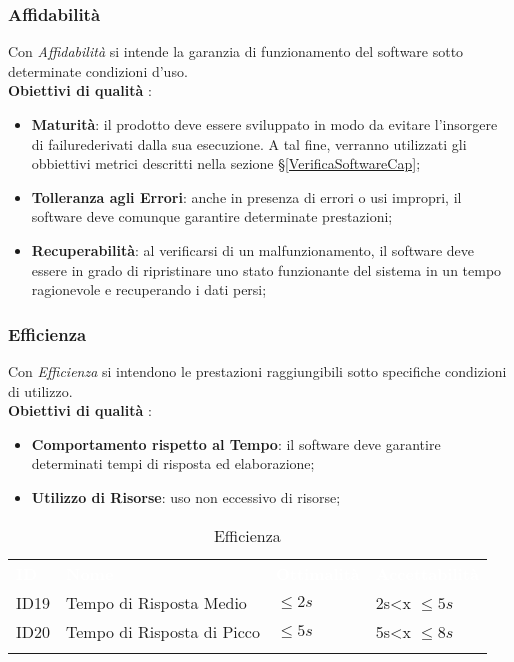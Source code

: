 \subsubsection{Affidabilità}

Con \textit{Affidabilità} si intende la garanzia di funzionamento del software sotto determinate condizioni d'uso. \\
\textbf{Obiettivi di qualità} :

\begin{itemize}
	\item \textbf{Maturità}: il prodotto deve essere sviluppato in modo da evitare l'insorgere di failure\glossario derivati dalla sua esecuzione. A tal fine, verranno utilizzati gli obbiettivi metrici descritti nella sezione §\ref{VerificaSoftwareCap};
	\item \textbf{Tolleranza agli Errori}: anche in presenza di errori o usi impropri, il software deve comunque garantire determinate prestazioni;
	\item \textbf{Recuperabilità}: al verificarsi di un malfunzionamento, il software deve essere in grado di ripristinare uno stato funzionante del sistema in un tempo ragionevole e recuperando i dati persi;
\end{itemize}


\subsubsection{Efficienza}

Con \textit{Efficienza} si intendono le prestazioni raggiungibili sotto specifiche condizioni di utilizzo. \\
\textbf{Obiettivi di qualità} :

\begin{itemize}
	\item \textbf{Comportamento rispetto al Tempo}: il software deve garantire determinati tempi di risposta ed elaborazione;
	\item \textbf{Utilizzo di Risorse}: uso non eccessivo di risorse;
\end{itemize}


\iffalse

\begin{longtable}{|C{.15\textwidth}|C{.24\textwidth}|C{.24\textwidth}|C{.24\textwidth}|}
\hline
{}\textbf{\textcolor{white}{ID}} & \textbf{\textcolor{white}{Nome}} & \textbf{\textcolor{white}{Ottimalità}} & \textbf{\textcolor{white}{Accettabilità}}\\
ID19 & Tempo di Risposta Medio & $\leq 2s$ & 2s<x $\leq 5s$\\
\hline
{}ID20 & Tempo di Risposta di Picco  & $\leq 5s$ & 5s<x $\leq 8s$ \\ 
\hline
\caption{Efficienza}
\label{Efficienza}
\end{longtable}

